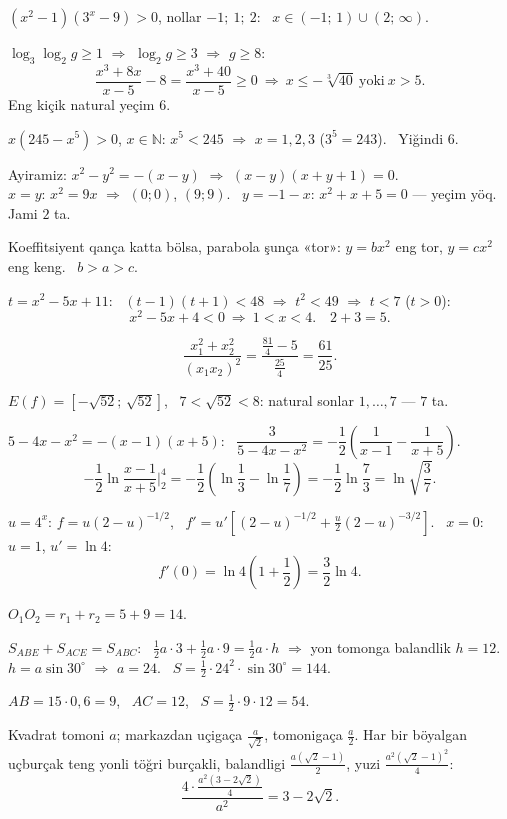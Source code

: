 $\left(x^2-1\right)\left(3^x-9\right)>0$, nollar $-1;\ 1;\ 2$: \ $x\in(-1;\,1)\cup(2;\,\infty)$.

$\log_3\log_2g\ge1$ $\Rightarrow$ $\log_2g\ge3$ $\Rightarrow$ $g\ge8$:
\[\frac{x^3+8x}{x-5}-8=\frac{x^3+40}{x-5}\ge0\ \Rightarrow\ x\le-\sqrt[3]{40}\ \text{yoki}\ x>5.\]
Eng kiçik natural yeçim $6$.

$x\left(245-x^5\right)>0$, $x\in\mathbb N$: $x^5<245$ $\Rightarrow$ $x=1,2,3$ ($3^5=243$). \ Yiğindi $6$.

Ayiramiz: $x^2-y^2=-(x-y)$ $\Rightarrow$ $(x-y)(x+y+1)=0$.\\
$x=y$: $x^2=9x$ $\Rightarrow$ $(0;0)$, $(9;9)$. \ $y=-1-x$: $x^2+x+5=0$ — yeçim yöq. Jami $2$ ta.

Koeffitsiyent qança katta bölsa, parabola şunça «tor»: $y=bx^2$ eng tor, $y=cx^2$ eng keng. \ $b>a>c$.

$t=x^2-5x+11$: \ $(t-1)(t+1)<48$ $\Rightarrow$ $t^2<49$ $\Rightarrow$ $t<7$ ($t>0$):
\[x^2-5x+4<0\ \Rightarrow\ 1<x<4.\quad 2+3=5.\]

\[\frac{x_1^2+x_2^2}{(x_1x_2)^2}=\frac{\frac{81}4-5}{\frac{25}4}=\frac{61}{25}.\]

$E(f)=\left[-\sqrt{52};\,\sqrt{52}\right]$, \ $7<\sqrt{52}<8$: natural sonlar $1,\dots,7$ — $7$ ta.

$5-4x-x^2=-(x-1)(x+5)$: \ $\dfrac3{5-4x-x^2}=-\dfrac12\left(\dfrac1{x-1}-\dfrac1{x+5}\right)$.
\[-\frac12\ln\frac{x-1}{x+5}\Big|_2^4=-\frac12\left(\ln\frac13-\ln\frac17\right)=-\frac12\ln\frac73=\ln\sqrt{\frac37}.\]

$u=4^x$: $f=u(2-u)^{-1/2}$, \ $f'=u'\left[(2-u)^{-1/2}+\frac u2(2-u)^{-3/2}\right]$. \ $x=0$: $u=1$, $u'=\ln4$:
\[f'(0)=\ln4\left(1+\frac12\right)=\frac32\ln4.\]

$O_1O_2=r_1+r_2=5+9=14$.

$S_{ABE}+S_{ACE}=S_{ABC}$: \ $\frac12a\cdot3+\frac12a\cdot9=\frac12a\cdot h$ $\Rightarrow$ yon tomonga balandlik $h=12$.\\
$h=a\sin30^\circ$ $\Rightarrow$ $a=24$. \ $S=\frac12\cdot24^2\cdot\sin30^\circ=144$.

$AB=15\cdot0{,}6=9$, \ $AC=12$, \ $S=\frac12\cdot9\cdot12=54$.

Kvadrat tomoni $a$; markazdan uçigaça $\frac a{\sqrt2}$, tomonigaça $\frac a2$. Har bir böyalgan uçburçak teng yonli töğri burçakli, balandligi $\frac{a\left(\sqrt2-1\right)}2$, yuzi $\frac{a^2\left(\sqrt2-1\right)^2}4$:
\[\frac{4\cdot\frac{a^2\left(3-2\sqrt2\right)}4}{a^2}=3-2\sqrt2.\]

